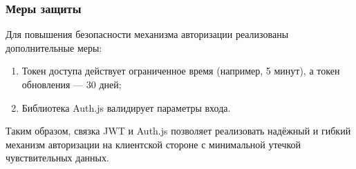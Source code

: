 \subsubsection{Меры защиты}
Для повышения безопасности механизма авторизации реализованы дополнительные меры:

\begin{enumerate}
  \item Токен доступа действует ограниченное время (например, 5 минут), а токен обновления — 30 дней;
  \item Библиотека Auth.js валидирует параметры входа.
\end{enumerate}

Таким образом, связка JWT и Auth.js позволяет реализовать надёжный и гибкий механизм авторизации на клиентской стороне с минимальной утечкой чувствительных данных.